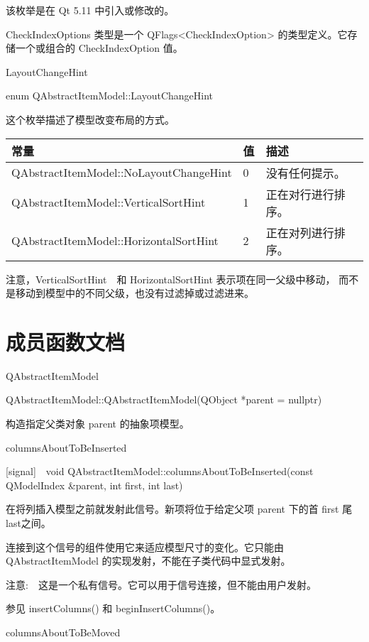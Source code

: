 该枚举是在 Qt 5.11 中引入或修改的。

CheckIndexOptions 类型是一个 QFlags<CheckIndexOption> 的类型定义。它存储一个或组合的 CheckIndexOption 值。

\splitLine

LayoutChangeHint

enum QAbstractItemModel::LayoutChangeHint

这个枚举描述了模型改变布局的方式。

\begin{tabular}{|l|l|l|}
\hline
常量 &值&描述\\
\hline
QAbstractItemModel::NoLayoutChangeHint&	0&	没有任何提示。\\
\hline
QAbstractItemModel::VerticalSortHint&	1&	正在对行进行排序。\\
\hline
QAbstractItemModel::HorizontalSortHint&	2&	正在对列进行排序。\\
\hline
\end{tabular}

注意，VerticalSortHint　和 HorizontalSortHint 表示项在同一父级中移动，
而不是移动到模型中的不同父级，也没有过滤掉或过滤进来。

\splitLine

\section{成员函数文档}

QAbstractItemModel

QAbstractItemModel::QAbstractItemModel(QObject *parent = nullptr)

构造指定父类对象 parent 的抽象项模型。

columnsAboutToBeInserted

[signal] void QAbstractItemModel::columnsAboutToBeInserted(const QModelIndex \&parent, int first, int last)

在将列插入模型之前就发射此信号。新项将位于给定父项 parent 下的首 first 尾 last之间。

\begin{notice}
	连接到这个信号的组件使用它来适应模型尺寸的变化。它只能由 QAbstractItemModel 的实现发射，不能在子类代码中显式发射。
\end{notice}

注意:　这是一个私有信号。它可以用于信号连接，但不能由用户发射。

参见 insertColumns() 和 beginInsertColumns()。

columnsAboutToBeMoved


